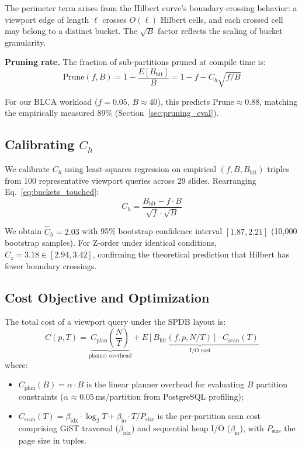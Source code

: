\documentclass[sigconf]{acmart}
\begin{document}
The perimeter term arises from the Hilbert curve's boundary-crossing behavior: a viewport edge of length $\ell$ crosses $O(\ell)$ Hilbert cells, and each crossed cell may belong to a distinct bucket.
The $\sqrt{B}$ factor reflects the scaling of bucket granularity.

\textbf{Pruning rate.}
The fraction of sub-partitions pruned at compile time is:
\begin{equation}
\text{Prune}(f, B) = 1 - \frac{E[B_{\text{hit}}]}{B} = 1 - f - C_h \sqrt{f / B}
\label{eq:prune_rate}
\end{equation}

For our BLCA workload ($f = 0.05$, $B \approx 40$), this predicts $\text{Prune} \approx 0.88$, matching the empirically measured 89\% (Section~\ref{sec:pruning_eval}).

\subsection{Calibrating $C_h$}
\label{sec:ch_calibration}

We calibrate $C_h$ using least-squares regression on empirical $(f, B, B_{\text{hit}})$ triples from 100 representative viewport queries across 29 slides.
Rearranging Eq.~\ref{eq:buckets_touched}:
\begin{equation}
C_h = \frac{B_{\text{hit}} - f \cdot B}{\sqrt{f} \cdot \sqrt{B}}
\end{equation}

We obtain $\hat{C}_h = 2.03$ with 95\% bootstrap confidence interval $[1.87, 2.21]$ (10{,}000 bootstrap samples).
For Z-order under identical conditions, $\hat{C}_z = 3.18 \in [2.94, 3.42]$, confirming the theoretical prediction that Hilbert has fewer boundary crossings.

\subsection{Cost Objective and Optimization}
\label{sec:cost_objective}

The total cost of a viewport query under the SPDB layout is:
\begin{equation}
C(p, T) = \underbrace{C_{\text{plan}}\!\left(\frac{N}{T}\right)}_{\text{planner overhead}} + \underbrace{E[B_{\text{hit}}(f, p, N/T)] \cdot C_{\text{scan}}(T)}_{\text{I/O cost}}
\label{eq:cost_objective}
\end{equation}
where:
\begin{itemize}
\item $C_{\text{plan}}(B) = \alpha \cdot B$ is the linear planner overhead for evaluating $B$ partition constraints ($\alpha \approx 0.05$\,ms/partition from PostgreSQL profiling);
\item $C_{\text{scan}}(T) = \beta_{\text{idx}} \cdot \log_2 T + \beta_{\text{io}} \cdot T / P_{\text{size}}$ is the per-partition scan cost comprising GiST traversal ($\beta_{\text{idx}}$) and sequential heap I/O ($\beta_{\text{io}}$), with $P_{\text{size}}$ the page size in tuples.
\end{itemize}
\end{document}
